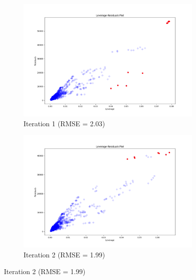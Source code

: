 \begin{figure}[h]
\centering

\begin{subfigure}{.5\textwidth}
    \centering
    \includegraphics[width=0.9\linewidth]{images/FeOT_Full_1.png}
    \caption{Iteration 1 (RMSE = 2.03)}
    \label{fig:iteration1}
\end{subfigure}%
\begin{subfigure}{.5\textwidth}
    \centering
    \includegraphics[width=0.9\linewidth]{images/FeOT_Full_2.png}
    \caption{Iteration 2 (RMSE = 1.99)}
    \label{fig:iteration2}
\end{subfigure}


\end{figure}
